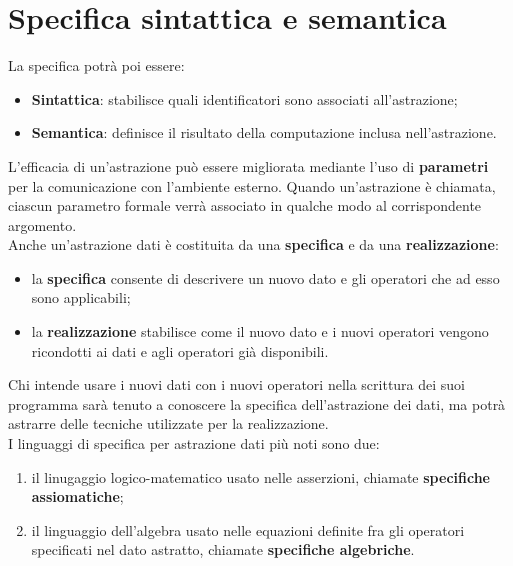 \documentclass[12pt]{report}
\begin{document}
 	\section{Specifica sintattica e semantica}
 	La specifica potrà poi essere:
 	\begin{itemize}
 		\item \textbf{Sintattica}: stabilisce quali identificatori sono associati all'astrazione;
 		\item \textbf{Semantica}: definisce il risultato della computazione inclusa nell'astrazione.
 	\end{itemize}
 	L'efficacia di un'astrazione può essere migliorata mediante l'uso di \textbf{parametri} per la comunicazione con l'ambiente esterno. Quando un'astrazione è chiamata, ciascun parametro formale verrà associato in qualche modo al corrispondente argomento. \\
 	Anche un'astrazione dati è costituita da una \textbf{specifica} e da una \textbf{realizzazione}:
 	\begin{itemize}
 		\item la \textbf{specifica} consente di descrivere un nuovo dato e gli operatori che ad esso sono applicabili;
 		\item la \textbf{realizzazione} stabilisce come il nuovo dato e i nuovi operatori vengono ricondotti ai dati e agli operatori già disponibili.
 	\end{itemize}
 	Chi intende usare i nuovi dati con i nuovi operatori nella scrittura dei suoi programma sarà tenuto a conoscere la specifica dell'astrazione dei dati, ma potrà astrarre delle tecniche utilizzate per la realizzazione. \\
 	I linguaggi di specifica per astrazione dati più noti sono due:
 	\begin{enumerate}
 		\item il linugaggio logico-matematico usato nelle asserzioni, chiamate \textbf{specifiche assiomatiche};
 		\item il linguaggio dell'algebra usato nelle equazioni definite fra gli operatori specificati nel dato astratto, chiamate \textbf{specifiche algebriche}.
 	\end{enumerate}
\end{document}
